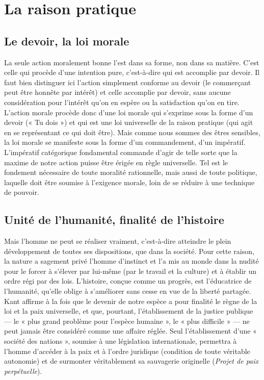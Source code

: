 
\section{La raison pratique}

\subsection{Le devoir, la loi morale}

La seule action moralement bonne l’est
dans sa forme, non dans sa matière.
C'est celle qui procède d’une intention
pure, c'est-à-dire qui est accomplie par
devoir. Il faut bien distinguer ici l’action
simplement conforme au devoir (le
commerçant peut être honnête par intérêt)
et celle accomplie par devoir, sans
aucune considération pour l'intérêt
qu'on en espère ou la satisfaction qu’on
en tire. L'action morale procède donc
d'une loi morale qui s'exprime sous la
forme d’un devoir (« Tu dois ») et qui est
une loi universelle de la raison pratique
(qui agit en se représentant ce qui doit
être). Mais comme nous sommes des
êtres sensibles, la loi morale se manifeste
sous la forme d’un commandement,
d’un impératif. L'impératif catégorique
fondamental commande d’agir
de telle sorte que la maxime de notre
action puisse être érigée en règle universelle.
Tel est le fondement nécessaire
de toute moralité rationnelle, mais aussi
de toute politique, laquelle doit être soumise
à l'exigence morale, loin de se
réduire à une technique de pouvoir.

\subsection{Unité de l'humanité, finalité de l’histoire}

Mais l’homme ne peut se réaliser vraiment,
c’est-à-dire atteindre le plein
développement de toutes ses dispositions,
que dans la société. Pour cette raison,
la nature a sagement privé l’homme
d’instinct et l’a mis au monde dans la
nudité pour le forcer à s'élever par lui-même
(par le travail et la culture) et à
établir un ordre régi par des lois. L’histoire,
conçue comme un progrès, est
l’éducatrice de l'humanité, qu’elle oblige
à s'améliorer sans cesse en vue de la
liberté partagée. Kant affirme à la fois
que le devenir de notre espèce a pour
finalité le règne de la loi et la paix universelle,
et que, pourtant, l’établissement
de la justice publique — le « plus
grand problème pour l'espèce
humaine », le « plus difficile » — ne peut
jamais être considéré comme une affaire
%
réglée. Seul l'établissement d’une
« société des nations », soumise à une
législation internationale, permettra à
l’homme d'accéder à la paix et à l’ordre
juridique (condition de toute véritable
autonomie) et de surmonter véritablement
sa sauvagerie originelle ({\it Projet de
paix perpétuelle}).

